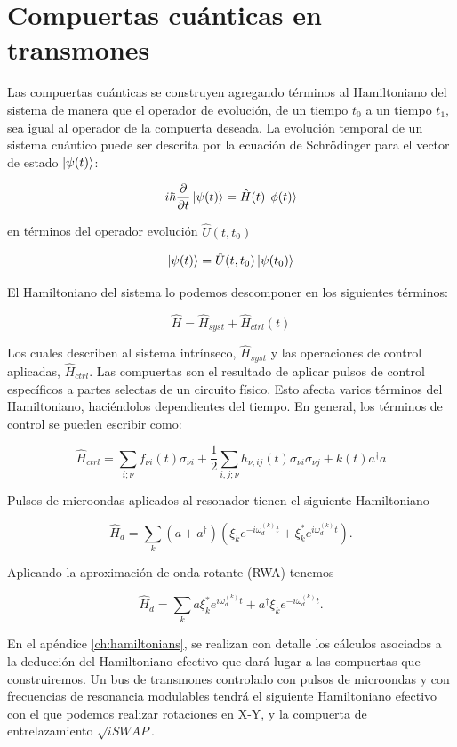 \section{Compuertas cuánticas en transmones}

Las compuertas cuánticas se construyen agregando términos al Hamiltoniano del sistema de manera que el operador de evolución, de un tiempo $t_0$ a un tiempo $t_1$, sea igual al operador de la compuerta deseada. La evolución temporal de un sistema cuántico puede ser descrita por la ecuación de Schrödinger para el vector de estado $\ket{\psi(t)}$:

\[
i \hbar \frac{\partial}{\partial t} \ket{\psi(t)} = \hat{H}(t) \ket{\phi(t)}
\]

en términos del operador evolución $\hat{U}(t,t_0)$

\[
\ket{\psi(t)} = \hat{U}(t,t_0) \ket{\psi(t_0)}
\]

El Hamiltoniano del sistema lo podemos descomponer en los siguientes términos:

\[
\hat{H} = \hat{H}_{syst} + \hat{H}_{ctrl}(t)
\]

Los cuales describen al sistema intrínseco, $\hat{H}_{syst}$ y las operaciones de control aplicadas, $\hat{H}_{ctrl}$. Las compuertas son el resultado de aplicar pulsos de control específicos a partes selectas de un circuito físico. Esto afecta varios términos del Hamiltoniano, haciéndolos dependientes del tiempo. En general, los términos de control se pueden escribir como:

\[
\hat{H}_{ctrl} = \sum\limits_{i; \nu} f_{\nu i}(t) \sigma_{\nu i} + \frac{1}{2} \sum\limits_{i,j;\nu} h_{\nu, ij}(t) \sigma_{\nu i} \sigma_{\nu j} + k(t) a^\dag a
\]

Pulsos de microondas aplicados al resonador tienen el siguiente Hamiltoniano

\begin{equation}
    \hat{H}_d = \sum\limits_k (a+a^\dagger) (\xi_k e^{-i\omega_d^{(k)}t} + \xi_k^*e^{i\omega_d^{(k)}t}) .
\end{equation}

Aplicando la aproximación de onda rotante (RWA) tenemos

\begin{equation}
    \hat{H}_d=\sum\limits_k a\xi_k^*e^{i\omega_d^{(k)}t}+ a^\dagger\xi_ke^{-i\omega_d^{(k)}t} .
\end{equation}

En el apéndice \ref{ch:hamiltonians}, se realizan con detalle los cálculos asociados a la deducción del Hamiltoniano efectivo que dará lugar a las compuertas que construiremos. Un bus de transmones controlado con pulsos de microondas y con frecuencias de resonancia modulables tendrá el siguiente Hamiltoniano efectivo con el que podemos realizar rotaciones en X-Y, y la compuerta de entrelazamiento $\sqrt{iSWAP}$.

